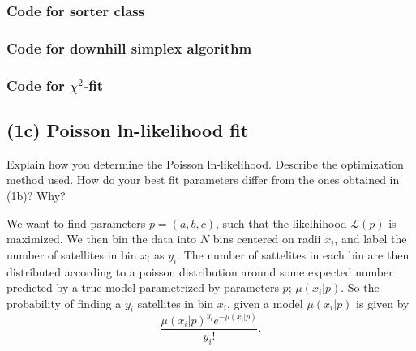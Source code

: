 \documentclass{article}
\newcommand{\CodeDir}{Code}
\begin{document}
\subsubsection{Code for sorter class}


\subsubsection{Code for downhill simplex algorithm}


\subsubsection{Code for $\chi^2$-fit}

 





\subsection{(1c) Poisson ln-likelihood fit}

Explain how you determine the Poisson ln-likelihood. Describe the optimization method used. 
How do your best fit parameters differ from the ones obtained in (1b)? Why?

We want to find parameters $p = (a, b, c)$, such that the likelhihood $\mathcal{L}(p)$ is maximized.
We then bin the data into $N$ bins centered on radii $x_i$, and label the number of 
satellites in bin $x_i$ as $y_i$. The number of sattelites in each bin are then 
distributed according to a poisson distribution around some expected number predicted 
by a true model parametrized by parameters $p$; $\mu(x_i|p)$. 
So the probability of finding a $y_i$ satellites in bin $x_i$,
given a model $\mu(x_i|p)$ is given by
\begin{equation}
  \frac{
    \mu(x_i|p)^{y_i}e^{-\mu(x_i|p)}
  }
  {
    y_i!
  }
  .
\end{equation}
\end{document}
